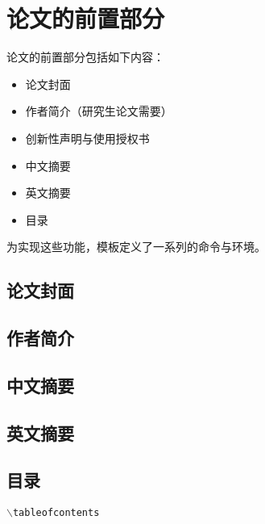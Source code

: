 

\chapter{论文的前置部分}
\label{cha:frontmatter}

论文的前置部分包括如下内容：
\begin{itemize}
\item 论文封面
\item 作者简介（研究生论文需要）
\item 创新性声明与使用授权书
\item 中文摘要
\item 英文摘要
\item 目录
\end{itemize}

为实现这些功能，模板定义了一系列的命令与环境。


\section{论文封面}
\label{sec:cover}

\section{作者简介}
\label{sec:author}

\section{中文摘要}
\label{sec:abstract-chs}


\section{英文摘要}
\label{sec:abstract-eng}

\section{目录}
\label{sec:toc}

\texttt{$\backslash$tableofcontents}


